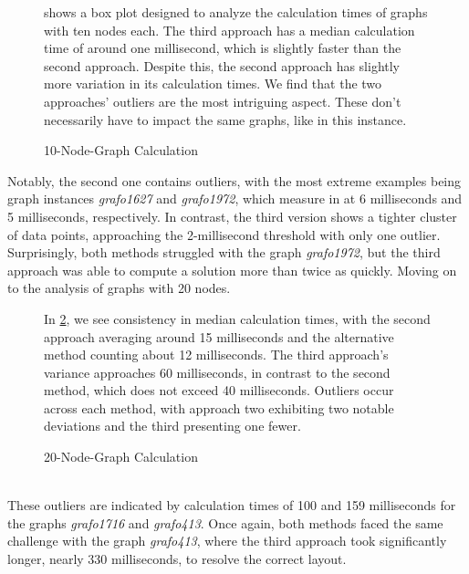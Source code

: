 \documentclass[bachelor, english]{algothesis}
\begin{document}
\begin{figure}[ht]
  \centering
  \begin{minipage}{0.5\textwidth}
        \hspace{-1cm}
        
  \caption{10-Node-Graph Calculation}
  \label{fig:Calc_10_Nodes}
  \end{minipage}%
  \begin{minipage}{0.5\textwidth}
  \vspace{-0.3cm}
     shows a box plot designed to analyze the calculation times of graphs with ten nodes each. The third approach has a median calculation time of around one millisecond, which is slightly faster than the second approach. Despite this, the second approach has slightly more variation in its calculation times. We find that the two approaches' outliers are the most intriguing aspect. These don't necessarily have to impact the same graphs, like in this instance.
  \end{minipage}
\end{figure}
\noindent
Notably, the second one contains outliers, with the most extreme examples being graph instances \textit{grafo1627} and \textit{grafo1972}, which measure in at 6 milliseconds and 5 milliseconds, respectively. In contrast, the third version shows a tighter cluster of data points, approaching the 2-millisecond threshold with only one outlier. Surprisingly, both methods struggled with the graph \textit{grafo1972}, but the third approach was able to compute a solution more than twice as quickly. Moving on to the analysis of graphs with 20 nodes.
\noindent
\begin{figure}[ht]
  \centering
  \begin{minipage}{0.5\textwidth}
        \hspace{-0.9cm}
        
  \caption{20-Node-Graph Calculation}
  \label{fig:Calc_20_Nodes}
  \end{minipage}
  \begin{minipage}{0.47\textwidth}
  \vspace{-0.3cm}
In \cref{fig:Calc_20_Nodes}, we see consistency in median calculation times, with the second approach averaging around 15 milliseconds and the alternative method counting about 12 milliseconds. The third approach's variance approaches 60 milliseconds, in contrast to the second method, which does not exceed 40 milliseconds. Outliers occur across each method, with approach two exhibiting two notable deviations and the third presenting one fewer. 
  \end{minipage}
\end{figure}
\\
These outliers are indicated by calculation times of 100 and 159 milliseconds for the graphs \textit{grafo1716} and \textit{grafo413}. Once again, both methods faced the same challenge with the graph \textit{grafo413}, where the third approach took significantly longer, nearly 330 milliseconds, to resolve the correct layout.
\end{document}
